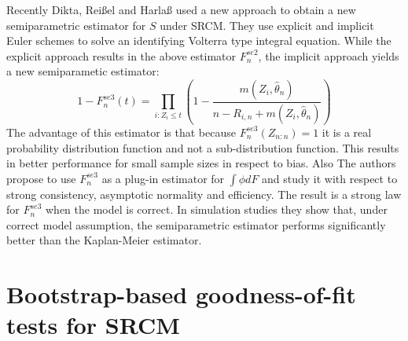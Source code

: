 Recently Dikta, Reißel and Harlaß used a new approach to obtain a new semiparametric estimator for $S$ under SRCM. They use explicit and implicit Euler schemes to solve an identifying Volterra type integral equation. While the explicit approach results in the above estimator $F_n^{se2}$, the implicit approach yields a new semiparametic estimator:
\begin{equation}\label{fnse3}
1-F_n^{se3}(t) = \prod_{i:Z_i \leq t} \left( 1 - \frac{m(Z_i,\hat{\theta}_n)}{n-R_{i,n} + m(Z_i,\hat{\theta}_n)} \right)
\end{equation}
The advantage of this estimator is that because $F_n^{se3}(Z_{n:n}) = 1$ it is a real probability distribution function and not a sub-distribution function. This results in better performance for small sample sizes in respect to bias. Also 
The authors propose to use $F_n^{se3}$ as a plug-in estimator for $\int\phi dF$ and study it with respect to strong consistency, asymptotic normality and efficiency. The result is a strong law for $F_n^{se3}$ when the model is correct. In simulation studies they show that, under correct model assumption, the semiparametric estimator performs significantly better than the Kaplan-Meier estimator\cite{PAPER7}.

\section{Bootstrap-based goodness-of-fit tests for SRCM}

